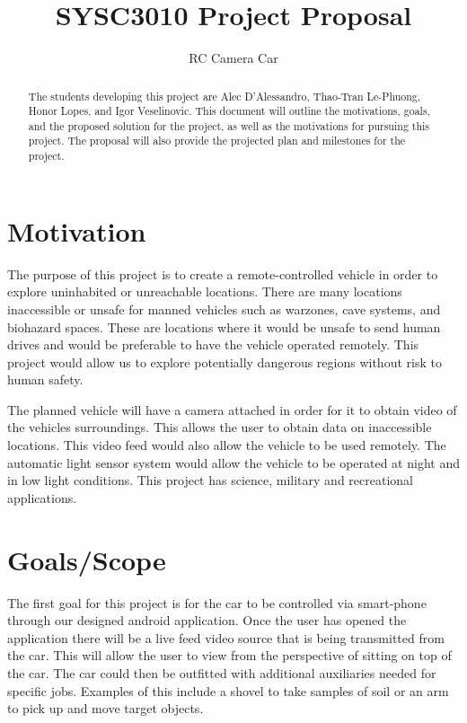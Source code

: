 \documentclass[letterpaper,12pt]{report}
\begin{document}
	\title{SYSC3010 Project Proposal}
	\author{RC Camera Car}
	\date{}
	\maketitle

	\begin{abstract}
		The students developing this project are Alec D'Alessandro, Thao-Tran
		Le-Phuong, Honor Lopes, and Igor Veselinovic. This document will
		outline the motivations, goals, and the proposed solution for the
		project, as well as the motivations for pursuing this project. The
		proposal will also provide the projected plan and milestones for the
		project.
	\end{abstract}

	\tableofcontents

	\pagebreak

	\section*{Motivation}
	\markright{}
	The purpose of this project is to create a remote-controlled vehicle in
	order to explore uninhabited or unreachable locations. There are many
	locations inaccessible or unsafe for manned vehicles such as warzones,
	cave systems, and biohazard spaces. These are locations where it would be
	unsafe to send human drives and would be preferable to have the vehicle
	operated remotely. This project would allow us to explore potentially
	dangerous regions without risk to human safety.

	The planned vehicle will have a camera attached in order for it to obtain
	video of the vehicles surroundings. This allows the user to obtain data on
	inaccessible locations. This video feed would also allow the vehicle to be
	used remotely. The automatic light sensor system would allow the vehicle to
	be operated at night and in low light conditions. This project has science,
	military and recreational applications.

	\section*{Goals/Scope}
	\markright{}
	The first goal for this project is for the car to be controlled via
	smart-phone through our designed android application. Once the user has
	opened the application there will be a live feed video source that is being
	transmitted from the car. This will allow the user to view from the
	perspective of sitting on top of the car. The car could then be outfitted
	with additional auxiliaries needed for specific jobs. Examples of this
	include a shovel to take samples of soil or an arm to pick up and move
	target objects.
\end{document}
